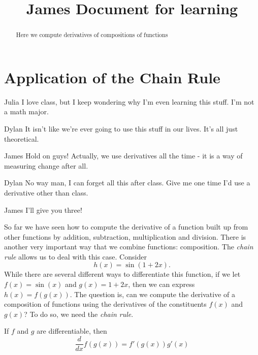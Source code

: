 \documentclass{ximera}
\begin{document}
\title{James Document for learning}
\section{Application of the Chain Rule}

\begin{abstract}
Here we compute derivatives of compositions of functions
\end{abstract}

\begin{dialogue}
\item[Julia] I love class, but I keep wondering why I'm even learning this stuff. I'm not a math major.
\item[Dylan] It isn't like we're ever going to use this stuff in our lives. It's all just theoretical.
\item[James] Hold on guys! Actually, we use derivatives all the time - it is a way of measuring change after all.
\item[Dylan] No way man, I can forget all this after class. Give me one time I'd use a derivative other than class.
\item[James] I'll give you three!
\end{dialogue}




So far we have seen how to compute the derivative of a function built
up from other functions by addition, subtraction, multiplication and
division. There is another very important way that we combine
functions: composition. The \textit{chain rule} allows us to deal with
this case. Consider
\[
h(x) = \sin(1+2x).
\] 
While there are several different ways to differentiate this function,
if we let $f(x) = \sin(x)$ and $g(x) = 1+2x$, then we can express
$h(x) = f(g(x))$. The question is, can we compute the derivative of a
composition of functions using the derivatives of the constituents
$f(x)$ and $g(x)$? To do so, we need the \textit{chain rule}.


\begin{theorem}
If $f$ and $g$ are differentiable, then
\[
\dfrac{d}{dx} f(g(x)) = f'(g(x))g'(x)
\]
\end{theorem}
\end{document}
